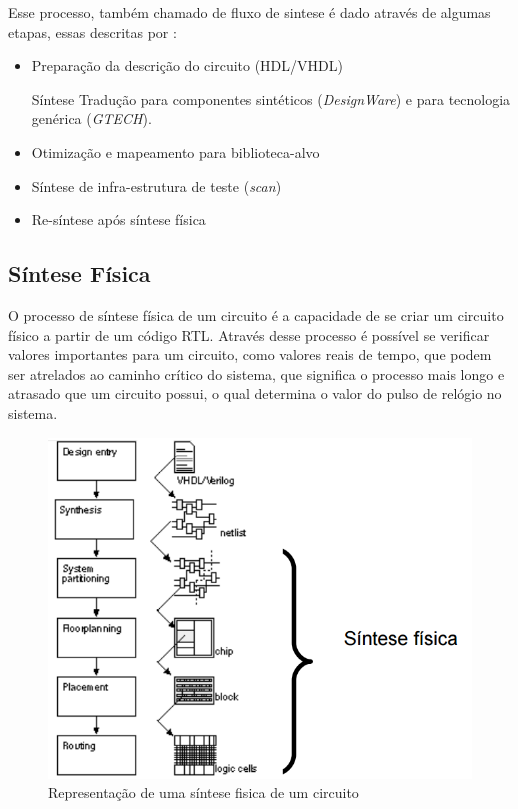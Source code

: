 \documentclass[
	11pt,				%
	openany,			%
	oneside,
	a4paper,			%
	chapter=TITLE,		%
	section=TITLE,		%
	english,			%
	brazil				%
	]{abntex2}
\begin{document}
Esse processo, também chamado de fluxo de sintese é dado através de algumas etapas, essas descritas por \cite{sintesertl}:

\begin{itemize}
\item Preparação da descrição do circuito (HDL/VHDL)
\item [Síntese] Tradução para componentes sintéticos (\textit{DesignWare}) e para tecnologia genérica (\textit{GTECH}).
\item Otimização e mapeamento para biblioteca-alvo
\item Síntese de infra-estrutura de teste (\textit{scan})
\item Re-síntese após síntese física
\end{itemize}

\subsection{Síntese Física}

O processo de síntese física de um circuito é a capacidade de se criar um circuito físico a partir de um código RTL. Através desse processo é possível se verificar valores importantes para um circuito, como valores reais de tempo, que podem ser atrelados ao caminho crítico do sistema, que significa o processo mais longo e atrasado que um circuito possui, o qual determina o valor do pulso de relógio no sistema. \cite{sintesefisicahamid}
\begin{figure}[htb]
	\caption{\label{fig_sintesefisica}Representação de uma síntese fisica de um circuito}
	\begin{center}
	    \includegraphics[scale=0.7]{fluxosfisica.png}
	\end{center}
\end{figure}
\end{document}

